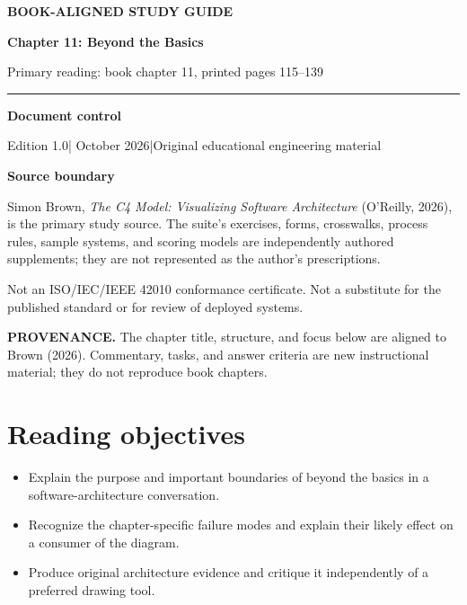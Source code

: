 \documentclass[10pt,letterpaper]{article}
\newcommand{\SourceNote}[1]{\par\smallskip\noindent\colorbox{C4Light}{\parbox{0.94\linewidth}{\footnotesize\textbf{PROVENANCE.} #1}}\par\medskip}
\newcommand{\DocStart}[3]{%
\begin{document}
\begin{titlepage}
\renewcommand{\thepage}{title-\arabic{page}}
\vspace*{0.55in}
{\sffamily\bfseries\small\color{C4Teal}#1}\par\vspace{0.24in}
{\sffamily\bfseries\fontsize{26}{31}\selectfont\color{C4Navy}#2}\par\vspace{0.18in}
{\large\color{C4Gray}#3}\par\vspace{0.4in}
\textcolor{C4Teal}{\rule{\linewidth}{1.15pt}}\par\vspace{0.24in}
\textbf{Document control}\par
Edition 1.0\quad|\quad 30 October 2026\quad|\quad Original educational engineering material\par
\vspace{0.17in}
\textbf{Source boundary}\par
Simon Brown, \emph{The C4 Model: Visualizing Software Architecture} (O'Reilly, 2026), is the primary study source. The suite's exercises, forms, crosswalks, process rules, sample systems, and scoring models are independently authored supplements; they are not represented as the author's prescriptions.\par
\vfill
{\small\color{C4Gray}Not an ISO/IEC/IEEE 42010 conformance certificate. Not a substitute for the published standard or for review of deployed systems.}\par
\end{titlepage}
}
\DocStart{BOOK-ALIGNED STUDY GUIDE}{Chapter 11: Beyond the Basics}{Primary reading: book chapter 11, printed pages 115–139}
\SourceNote{The chapter title, structure, and focus below are aligned to Brown (2026). Commentary, tasks, and answer criteria are new instructional material; they do not reproduce book chapters.}
\section{Reading objectives}
\begin{itemize}
\item Explain the purpose and important boundaries of beyond the basics in a software-architecture conversation.
\item Recognize the chapter-specific failure modes and explain their likely effect on a consumer of the diagram.
\item Produce original architecture evidence and critique it independently of a preferred drawing tool.
\end{itemize}
\end{document}
